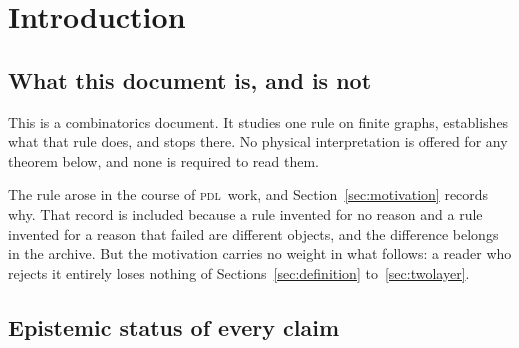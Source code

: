 \documentclass[11pt,a4paper]{article}
\newcommand{\PDL}{\textsc{pdl}}
\begin{document}
\clearpage
\tableofcontents
\newpage

\section{Introduction}
\label{sec:intro}

\subsection{What this document is, and is not}

This is a combinatorics document. It studies one rule on finite graphs, establishes what that rule does, and stops there. No physical interpretation is offered for any theorem below, and none is required to read them.

The rule arose in the course of \PDL\ work, and Section~\ref{sec:motivation} records why. That record is included because a rule invented for no reason and a rule invented for a reason that failed are different objects, and the difference belongs in the archive. But the motivation carries no weight in what follows: a reader who rejects it entirely loses nothing of Sections~\ref{sec:definition} to~\ref{sec:twolayer}.

\subsection{Epistemic status of every claim}
\end{document}
